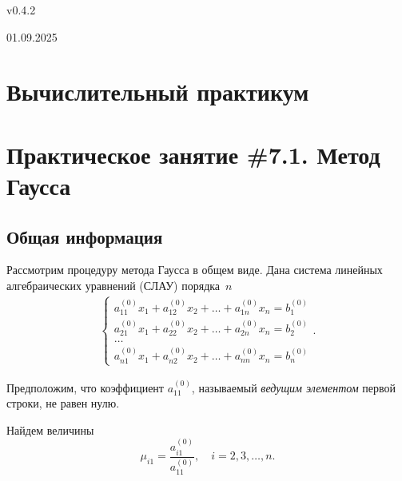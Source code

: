 \documentclass[12pt]{article}
\begin{document}
    \begin{flushright}
    {v0.4.2}
    \end{flushright}
    \begin{flushright}
	{01.09.2025}
	\end{flushright}
    \section*{Вычислительный практикум}
    \section*{Практическое занятие \#7.1. Метод Гаусса}

    \subsection*{Общая информация}

    Рассмотрим процедуру метода Гаусса в общем виде. Дана система линейных алгебраических уравнений (СЛАУ) порядка~$n$
    \begin{equation}
        \begin{gathered}
        	\begin{cases}
        		a_{11}^{\left(0\right)}x_1+a_{12}^{\left(0\right)}x_2+\ldots+a_{1n}^{\left(0\right)}x_n=b_{1}^{\left(0\right)}\\
        		a_{21}^{\left(0\right)}x_1+a_{22}^{\left(0\right)}x_2+\ldots+a_{2n}^{\left(0\right)}x_n=b_{2}^{\left(0\right)}\\
        		\ldots\\
        		a_{n1}^{\left(0\right)}x_1+a_{n2}^{\left(0\right)}x_2+\ldots+a_{nn}^{\left(0\right)}x_n=b_{n}^{\left(0\right)}
        	\end{cases}.
        \end{gathered}\label{7.1:f1}
    \end{equation}

    Предположим, что коэффициент $a_{11}^{\left(0\right)}$, называемый \emph{ведущим элементом} первой строки, не равен нулю.

    Найдем величины
    \begin{equation}
        \mu_{i1} = \frac{a^{\left(0\right)}_{i1}}{a^{\left(0\right)}_{11}},\quad i=2,3,\ldots, n.\label{7.1:f2}
    \end{equation}
    
\end{document}
